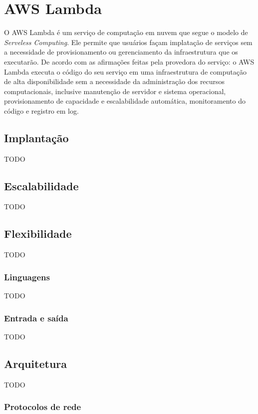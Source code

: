 \section{AWS Lambda}

O AWS Lambda é um serviço de computação em nuvem que segue o modelo de \textit{Serveless Computing}.
Ele permite que usuários façam implatação de serviços sem a necessidade de provisionamento ou gerenciamento da infraestrutura que os executarão.
De acordo com as afirmações feitas pela provedora do serviço:
o AWS Lambda executa o código do seu serviço em uma infraestrutura de computação de alta disponibilidade sem a necessidade da administração dos recursos computacionais, inclusive manutenção de servidor e sistema operacional, provisionamento de capacidade e escalabilidade automática, monitoramento do código e registro em log.


\subsection{Implantação}

TODO

\subsection{Escalabilidade}

TODO

\subsection{Flexibilidade}

TODO

\subsubsection{Linguagens}

TODO

\subsubsection{Entrada e saída}

TODO

\subsection{Arquitetura}

TODO

\subsubsection{Protocolos de rede}

